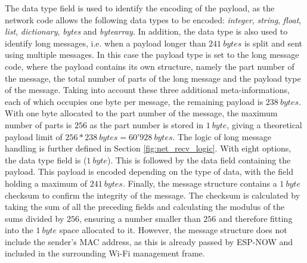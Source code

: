The data type field is used to identify the encoding of the payload, as the network code allows the following data types to be encoded: \textit{integer}, \textit{string}, \textit{float}, \textit{list}, \textit{dictionary}, \textit{bytes} and \textit{bytearray}. In addition, the data type is also used to identify long messages, i.e. when a payload longer than $241\ bytes$ is split and sent using multiple messages. In this case the payload type is set to the long message code, where the payload contains its own structure, namely the part number of the message, the total number of parts of the long message and the payload type of the message. Taking into account these three additional meta-informations, each of which occupies one byte per message, the remaining payload is $238\ bytes$. With one byte allocated to the part number of the message, the maximum number of parts is $256$ as the part number is stored in $1\ byte$, giving a theoretical payload limit of $256*238\ bytes = 60'928\ bytes$. The logic of long message handling is further defined in Section \ref{fig:net_recv_logic}. With eight options, the data type field is ($1\ byte$).
This is followed by the data field containing the payload. This payload is encoded depending on the type of data, with the field holding a maximum of $241\ bytes$.
Finally, the message structure contains a $1\ byte$ checksum to confirm the integrity of the message. The checksum is calculated by taking the sum of all the preceding fields and calculating the modulus of the sums divided by $256$, ensuring a number smaller than $256$ and therefore fitting into the $1\ byte$ space allocated to it. 
However, the message structure does not include the sender's MAC address, as this is already passed by ESP-NOW and included in the surrounding Wi-Fi management frame.



